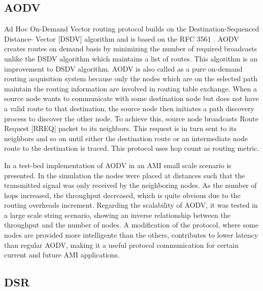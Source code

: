 \documentclass[11pt,draftclsnofoot,onecolumn]{IEEEtran}
\begin{document}
\subsection{AODV}\label{aodv}

Ad Hoc On-Demand Vector routing protocol builds on the Destination-Sequenced Distance- Vector [DSDV] algorithm and is based on the RFC 3561 \cite{Perkins2003} . AODV creates routes on demand basis by minimizing the number of required broadcasts unlike the DSDV algorithm which maintains a list of routes. This algorithm is an improvement to DSDV algorithm. AODV  is also called as a pure on-demand routing acquisition system because only the nodes  which are on the selected path maintain the routing information are involved in routing  table exchange.  When a source node wants to communicate with some destination node but does not have a valid route to that destination, the source node then initiates a path discovery process to discover the other node. To achieve this, source node broadcasts Route Request [RREQ] packet to its neighbors. This request is in turn sent to its neighbors and so on until either the destination route or an intermediate node route to the destination is traced. This protocol uses hop count as routing metric.

In \cite{Toimoor2013} a test-bed implementation of AODV in an AMI small scale scenario is presented. In the simulation the nodes were placed at distances such that the transmitted signal was only received by the neighboring nodes. As the number of hops increased, the throughput decreased, which is quite obvious due to the routing overheads increment. Regarding the scalability of AODV, it was tested in a large scale string scenario, showing an inverse relationship between the throughput and the number of nodes. A modification of the protocol, where some nodes are provided more intelligente than the others, contributes to lower latency than regular AODV, making it a useful protocol communication for certain current and future AMI applications.


\subsection{DSR}\label{dsr}
\end{document}
